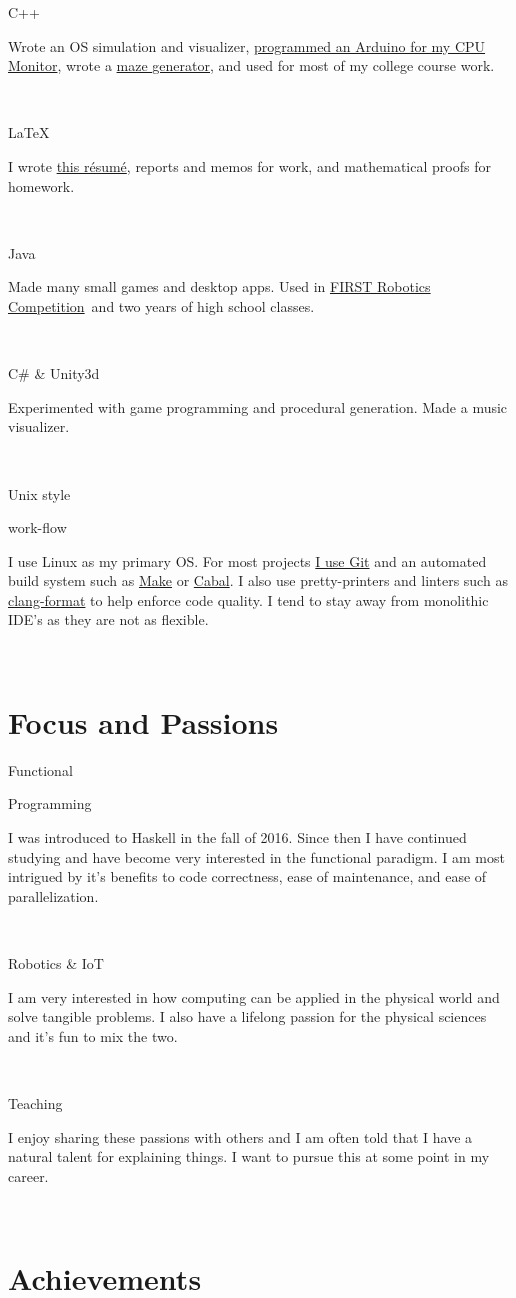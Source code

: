 \documentclass{article}
\newcommand{\jskill}[2]{

\begin{minipage}[t]{.15\textwidth}
\hfill #1
\end{minipage}
\hspace{.05em}\vline\hspace{.05em}
\begin{minipage}[t]{.80\textwidth}
#2
\end{minipage}\\\vspace{.1em}}
\newcommand{\frc}{\href{https://www.firstinspires.org/robotics/frc}{FIRST Robotics Competition}}
\begin{document}
\jskill{C++}{Wrote an OS simulation and visualizer, \href{https://github.com/joshuatshaffer/retro-cpu-monitor/tree/master/arduino/retro_cpu_monitor_sketch}{programmed an Arduino for my CPU Monitor}, wrote a \href{https://github.com/joshuatshaffer/Command-Line-Maze}{maze generator}, and used for most of my college course work.}

\jskill{\LaTeX}{I wrote \href{https://github.com/joshuatshaffer/resume}{this r\'esum\'e}, reports and memos for work, and mathematical proofs for homework.}

\jskill{Java}{Made many small games and desktop apps. Used in \frc\ and two years of high school classes.}

\jskill{C\# \& Unity3d}{Experimented with game programming and procedural generation. Made a music visualizer.}

\jskill{Unix style 

\hfill work-flow}{I use Linux as my primary OS. For most projects \href{https://github/joshuatshaffer}{I use Git} and an automated build system such as \href{https://en.wikipedia.org/wiki/Make_(software)}{Make} or \href{https://www.haskell.org/cabal/}{Cabal}. I also use pretty-printers and linters such as \href{http://clang.llvm.org/docs/ClangFormat.html}{clang-format} to help enforce code quality. I tend to stay away from monolithic IDE's as they are not as flexible.}

\section{Focus and Passions}

\jskill{Functional 

\hfill Programming} {I was introduced to Haskell in the fall of 2016. Since then I have continued studying and have become very interested in the functional paradigm. I am most intrigued by it's benefits to code correctness, ease of maintenance, and ease of parallelization.}

\jskill{Robotics \& IoT}{I am very interested in how computing can be applied in the physical world and solve tangible problems. I also have a lifelong passion for the physical sciences and it's fun to mix the two.}

\jskill{Teaching}{I enjoy sharing these passions with others and I am often told that I have a natural talent for explaining things. I want to pursue this at some point in my career.}

\section{Achievements}
\end{document}
